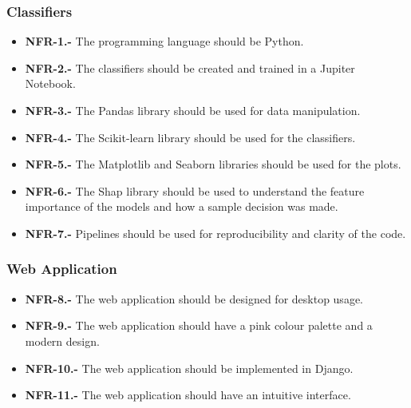 \subsubsection{Classifiers}

\begin{itemize}
    \item \textbf{NFR-1.-} The programming language should be Python.
    \item \textbf{NFR-2.-} The classifiers should be created and trained in a Jupiter Notebook.
    \item \textbf{NFR-3.-} The Pandas library should be used for data manipulation.
    \item \textbf{NFR-4.-} The Scikit-learn library should be used for the classifiers.
    \item \textbf{NFR-5.-} The Matplotlib and Seaborn libraries should be used for the plots.
    \item \textbf{NFR-6.-} The Shap library should be used to understand the feature importance of the models and how a sample decision was made.
    \item \textbf{NFR-7.-} Pipelines should be used for reproducibility and clarity of the code.
\end{itemize}

\subsubsection{Web Application}

\begin{itemize}
    \item \textbf{NFR-8.-} The web application should be designed for desktop usage.
    \item \textbf{NFR-9.-} The web application should have a pink colour palette and a modern design.
    \item \textbf{NFR-10.-} The web application should be implemented in Django.
    \item \textbf{NFR-11.-} The web application should have an intuitive interface.
\end{itemize}